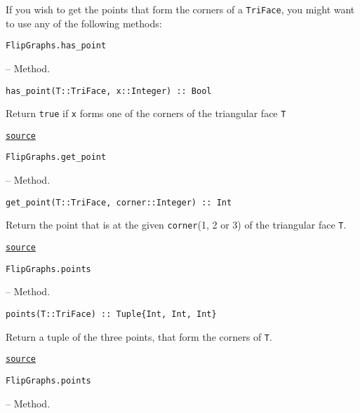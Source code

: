 If you wish to get the points that form the corners of a \texttt{TriFace}, you might want to use any of the following methods:


\hypertarget{299338672099245860}{\texttt{FlipGraphs.has\_point}}  -- {Method.}

\begin{adjustwidth}{2em}{0pt}


\begin{verbatim}
has_point(T::TriFace, x::Integer) :: Bool
\end{verbatim}

Return \texttt{true} if \texttt{x} forms one of the corners of the triangular face \texttt{T}



\href{https://github.com/schto223/FlipGraphs.jl/blob/e35d43698a06b86273148826b79d585ba04fcd26/src/deltaComplex.jl#L182-L187}{\texttt{source}}


\end{adjustwidth}
\hypertarget{11409664667544908067}{\texttt{FlipGraphs.get\_point}}  -- {Method.}

\begin{adjustwidth}{2em}{0pt}


\begin{verbatim}
get_point(T::TriFace, corner::Integer) :: Int
\end{verbatim}

Return the point that is at the given \texttt{corner}(1, 2 or 3) of the triangular face \texttt{T}.



\href{https://github.com/schto223/FlipGraphs.jl/blob/e35d43698a06b86273148826b79d585ba04fcd26/src/deltaComplex.jl#L197-L201}{\texttt{source}}


\end{adjustwidth}
\hypertarget{15026073979390803683}{\texttt{FlipGraphs.points}}  -- {Method.}

\begin{adjustwidth}{2em}{0pt}


\begin{verbatim}
points(T::TriFace) :: Tuple{Int, Int, Int}
\end{verbatim}

Return a tuple of the three points, that form the corners of \texttt{T}.



\href{https://github.com/schto223/FlipGraphs.jl/blob/e35d43698a06b86273148826b79d585ba04fcd26/src/deltaComplex.jl#L190-L194}{\texttt{source}}


\end{adjustwidth}
\hypertarget{15096165755102203171}{\texttt{FlipGraphs.points}}  -- {Method.}


